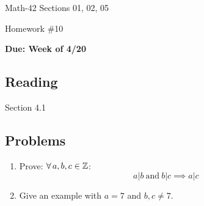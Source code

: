 \documentclass[letterpaper,12pt,fleqn]{article}
\begin{document}
\begin{center}
  \large
  Math-42 Sections 01, 02, 05

  \Large
  Homework \#10

  \large
  \textbf{Due: Week of 4/20}
\end{center}

\subsection*{Reading}

Section 4.1

\subsection*{Problems}

\begin{enumerate}
\item Prove: \(\forall\,a,b,c\in\mathbb{Z}\):
  \[a|b\ \text{and}\ b|c\implies a|c\]
\item Give an example with \(a=7\) and \(b,c\ne7\).
\end{enumerate}
\end{document}
